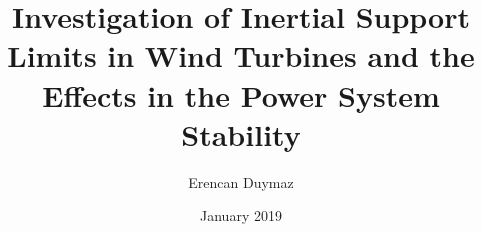\documentclass[chaparabic,ee,ms,12pt,oneandhalf]{metu}
\author{Erencan Duymaz}
\title{Investigation of Inertial Support Limits in Wind Turbines and the Effects in the Power System Stability}
\date{January 2019}
\begin{document}
\begin{preliminaries}



\end{preliminaries}
%   
% 
%

\setlength{\parindent}{0em}
\setlength{\parskip}{10pt}











%
%

%

\appendices
%

\end{document}
